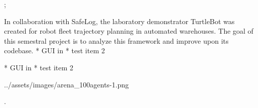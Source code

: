 

\worktype[B/EN]
\slideshow



\pg;


In collaboration with SafeLog, the laboratory demonstrator TurtleBot was created
for robot fleet trajectory planning in automated warehouses. The goal of this semestral
project is to analyze this framework and improve upon its codebase.
\begitems
* GUI in 
* test item 2
\enditems
\nl


\begitems
* GUI in 
* test item 2
\enditems
\nl

\centerline{\picw=14cm \inspic ../assets/images/arena_100agents-1.png }


\pg.